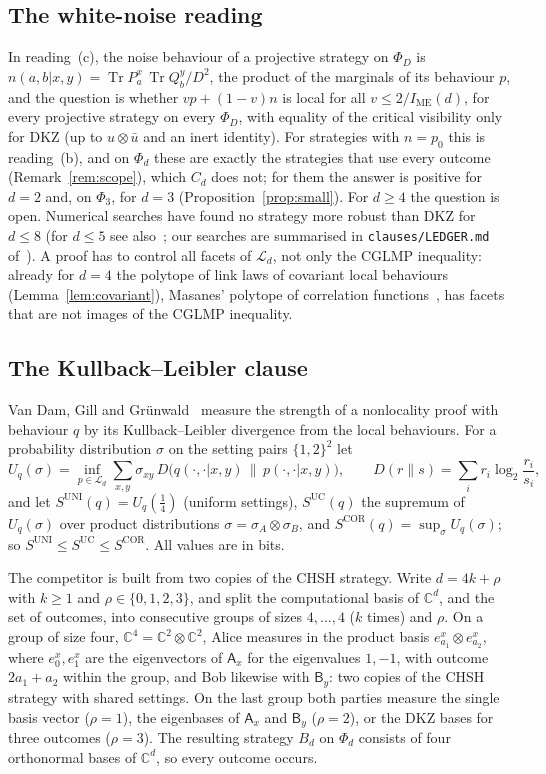 \documentclass[11pt]{amsart}
\theoremstyle{definition}
\theoremstyle{remark}
\numberwithin{equation}{section}
\newcommand{\C}{\mathbb{C}}
\newcommand{\Tr}{\operatorname{Tr}}
\newcommand{\IME}{I_{\mathrm{ME}}}
\newcommand{\cL}{\mathcal{L}}
\begin{document}
\subsection{The white-noise reading}\label{subsec:white}
In reading~(c), the noise behaviour of a projective strategy on $\Phi_D$ is $n(a,b|x,y)=\Tr P^x_a\,\Tr Q^y_b/D^2$, the
product of the marginals of its behaviour $p$, and the question is whether $vp+(1-v)n$ is local for all
$v\le2/\IME(d)$, for every projective strategy on every $\Phi_D$, with equality of the critical visibility only for
DKZ (up to $u\otimes\bar u$ and an inert identity). For strategies with $n=p_0$ this is reading~(b), and on $\Phi_d$
these are exactly the strategies that use every outcome (Remark~\ref{rem:scope}), which $C_d$ does not; for them the
answer is positive for $d=2$ and, on $\Phi_3$, for $d=3$ (Proposition~\ref{prop:small}). For $d\ge4$ the question is
open. Numerical searches have found no strategy more robust than DKZ for $d\le8$ (for $d\le5$ see
also~\cite{GLZ}; our searches are summarised in \texttt{clauses/LEDGER.md} of~\cite{repo-oqp27}). A proof
has to control all facets of $\cL_d$, not only the CGLMP inequality: already for $d=4$ the polytope of link laws of
covariant local behaviours (Lemma~\ref{lem:covariant}), Masanes' polytope of correlation functions~\cite{Masanes}, has
facets that are not images of the CGLMP inequality.

\subsection{The Kullback--Leibler clause}\label{subsec:kl}
Van Dam, Gill and Gr\"unwald~\cite{vDGG} measure the strength of a nonlocality proof with behaviour $q$ by its
Kullback--Leibler divergence from the local behaviours. For a probability distribution $\sigma$ on the setting pairs
$\{1,2\}^2$ let
\[
U_q(\sigma)=\inf_{p\in\cL_d}\sum_{x,y}\sigma_{xy}\,D\bigl(q(\cdot,\cdot|x,y)\,\big\|\,p(\cdot,\cdot|x,y)\bigr),\qquad
D(r\|s)=\sum_ir_i\log_2\frac{r_i}{s_i},
\]
and let $S^{\mathrm{UNI}}(q)=U_q(\frac14)$ (uniform settings), $S^{\mathrm{UC}}(q)$ the supremum of $U_q(\sigma)$ over
product distributions $\sigma=\sigma_A\otimes\sigma_B$, and $S^{\mathrm{COR}}(q)=\sup_\sigma U_q(\sigma)$; so
$S^{\mathrm{UNI}}\le S^{\mathrm{UC}}\le S^{\mathrm{COR}}$. All values are in bits.

The competitor is built from two copies of the CHSH strategy. Write $d=4k+\rho$ with $k\ge1$ and
$\rho\in\{0,1,2,3\}$, and split the computational basis of $\C^d$, and the set of outcomes, into consecutive groups of
sizes $4,\dots,4$ ($k$ times) and $\rho$. On a group of size four, $\C^4=\C^2\otimes\C^2$, Alice measures in the
product basis $e^x_{a_1}\otimes e^x_{a_2}$, where $e^x_0,e^x_1$ are the eigenvectors of $\mathsf A_x$ for the eigenvalues
$1,-1$, with outcome $2a_1+a_2$ within the group, and Bob likewise with $\mathsf B_y$: two copies of the CHSH strategy
with shared settings. On the last group both parties measure the single basis vector ($\rho=1$), the eigenbases of
$\mathsf A_x$ and $\mathsf B_y$ ($\rho=2$), or the DKZ bases for three outcomes ($\rho=3$). The resulting strategy $B_d$ on
$\Phi_d$ consists of four orthonormal bases of $\C^d$, so every outcome occurs.
\end{document}
